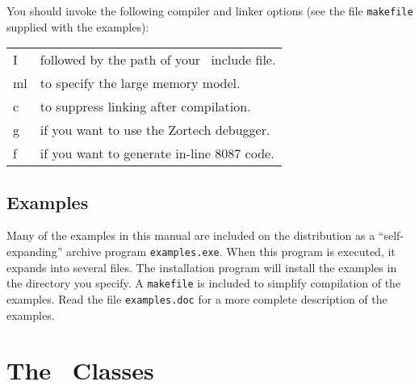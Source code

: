 \documentclass{admbmanual}
\makeatletter
\newenvironment{commandtable}
  {
    \par
    \begin{tabular}%
      {@{\vrule height 12pt depth7pt width0pt}@{\tt-}l @{\rm\quad} l}
  }
  {
    \end{tabular}
    \medskip
   }
\makeatother
\begin{document}
You should invoke the following compiler and linker options (see the file
\texttt{makefile} supplied with the examples):

\begin{commandtable}
 I  &  followed by the path of your \scAD\ include file.\\
 ml  &  to specify the large memory model.\\
 c  &  to suppress linking after compilation.\\
 g  &  if you want to use the Zortech debugger.\\
 f  &  if you want to generate in-line 8087 code.\\
\end{commandtable}

\section{Examples}

Many of the examples in this manual are included on the distribution
as a ``self-expanding'' archive program \texttt{examples.exe}. When this program
is executed, it expands into several files. The installation program will
install the examples in the directory you specify. A \texttt{makefile} is
included to simplify compilation of the examples. Read the file
\texttt{examples.doc} for a more complete description of the examples.


\chapter{The \scAD\ Classes}

\end{document}
